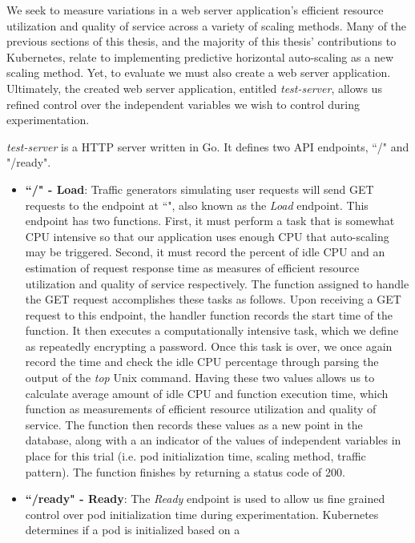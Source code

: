 We seek to measure variations in a web server application's
efficient resource utilization and quality of service across a variety of
scaling methods. Many of the previous sections of this thesis, and the majority
of this thesis' contributions to Kubernetes, relate to implementing predictive
horizontal auto-scaling as a new scaling method. Yet, to evaluate we must also
create a web server application. Ultimately, the created web server application,
entitled \textit{test-server}, allows us refined control over the independent
variables we wish to control during experimentation.

\textit{test-server} is a HTTP server written in Go. It defines two API
endpoints, ``/" and "/ready".

\begin{itemize}
  \item \textbf{``/" - Load}: Traffic generators simulating user requests will
    send GET requests to the endpoint at ``\/", also known as the \textit{Load} endpoint.
    This endpoint has two functions. First, it must perform a task that is
    somewhat CPU intensive so that our application uses enough CPU that
    auto-scaling may be triggered. Second, it must record the percent of idle CPU
    and an estimation of request response time as measures of
    efficient resource utilization and quality of service respectively. The
    function assigned to handle the GET request accomplishes these tasks as
    follows. Upon receiving a GET request to this endpoint, the handler function
    records the start time of the function. It then executes a computationally intensive
    task, which we define as repeatedly encrypting a password. Once this task
    is over, we once again record the time and check the idle CPU percentage
    through parsing the output of the \textit{top} Unix command.
    Having these two values allows us to calculate average amount of idle CPU
    and function execution time, which function as measurements of
    efficient resource utilization and quality of service. The function then
    records these values as a new point in the database, along with a
    an indicator of the values of independent variables in place for this trial
    (i.e. pod initialization time, scaling method, traffic pattern). The function finishes by
    returning a status code of 200.
  \item \textbf{``/ready" - Ready}: The \textit{Ready} endpoint is used to allow
    us fine grained control over pod initialization time during experimentation.
    Kubernetes determines if a pod is initialized based on a

\end{itemize}
